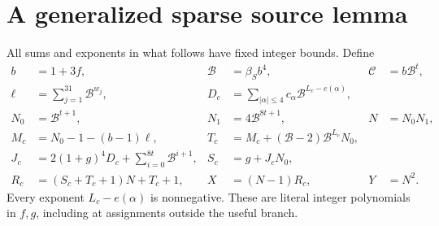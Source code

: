 \documentclass[11pt]{article}
\begin{document}
\section{A generalized sparse source lemma}
All sums and exponents in what follows have fixed integer bounds. Define
\begin{align*}
 b&=1+3f,& \mathcal B&=\beta_Sb^4,&\mathscr C&=b\mathcal B^t,\\
 \ell&=\sum_{j=1}^{31}\mathcal B^{w_j},&
 D_c&=\sum_{|\alpha|\le4}c_\alpha\mathcal B^{L_c-e(\alpha)},\\
 N_0&=\mathcal B^{t+1},&N_1&=4\mathcal B^{8t+1},&N&=N_0N_1,\\
 M_c&=N_0-1-(b-1)\ell,&
 T_c&=M_c+(\mathcal B-2)\mathcal B^{L_c}N_0,\\
 J_c&=2(1+g)^4D_c+\sum_{i=0}^{8t}\mathcal B^{i+1},&
 S_c&=g+J_cN_0,\\
 R_c&=(S_c+T_c+1)N+T_c+1,&
 X&=(N-1)R_c,&Y&=N^2.
\end{align*}
Every exponent $L_c-e(\alpha)$ is nonnegative. These are literal integer
polynomials in $f,g$, including at assignments outside the useful branch.
\end{document}

